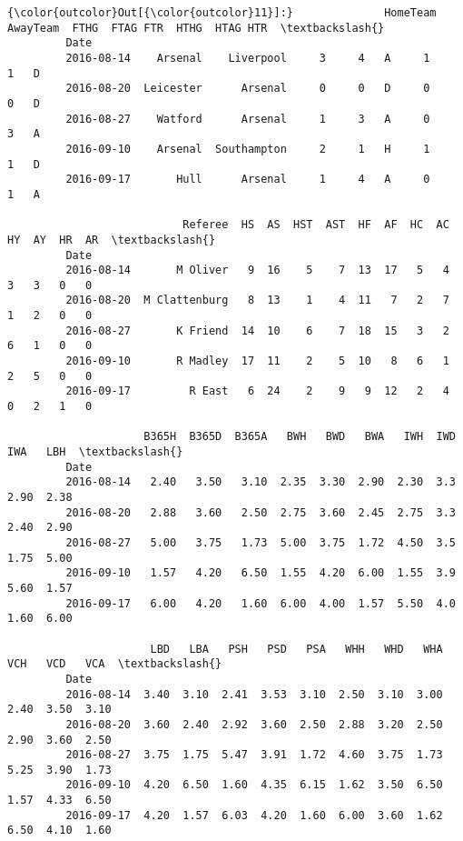 \documentclass[11pt]{article}
\begin{document}
\begin{Verbatim}[commandchars=\\\{\}]
{\color{outcolor}Out[{\color{outcolor}11}]:}              HomeTeam     AwayTeam  FTHG  FTAG FTR  HTHG  HTAG HTR  \textbackslash{}
         Date                                                                 
         2016-08-14    Arsenal    Liverpool     3     4   A     1     1   D   
         2016-08-20  Leicester      Arsenal     0     0   D     0     0   D   
         2016-08-27    Watford      Arsenal     1     3   A     0     3   A   
         2016-09-10    Arsenal  Southampton     2     1   H     1     1   D   
         2016-09-17       Hull      Arsenal     1     4   A     0     1   A   
         
                           Referee  HS  AS  HST  AST  HF  AF  HC  AC  HY  AY  HR  AR  \textbackslash{}
         Date                                                                          
         2016-08-14       M Oliver   9  16    5    7  13  17   5   4   3   3   0   0   
         2016-08-20  M Clattenburg   8  13    1    4  11   7   2   7   1   2   0   0   
         2016-08-27       K Friend  14  10    6    7  18  15   3   2   6   1   0   0   
         2016-09-10       R Madley  17  11    2    5  10   8   6   1   2   5   0   0   
         2016-09-17         R East   6  24    2    9   9  12   2   4   0   2   1   0   
         
                     B365H  B365D  B365A   BWH   BWD   BWA   IWH  IWD   IWA   LBH  \textbackslash{}
         Date                                                                       
         2016-08-14   2.40   3.50   3.10  2.35  3.30  2.90  2.30  3.3  2.90  2.38   
         2016-08-20   2.88   3.60   2.50  2.75  3.60  2.45  2.75  3.3  2.40  2.90   
         2016-08-27   5.00   3.75   1.73  5.00  3.75  1.72  4.50  3.5  1.75  5.00   
         2016-09-10   1.57   4.20   6.50  1.55  4.20  6.00  1.55  3.9  5.60  1.57   
         2016-09-17   6.00   4.20   1.60  6.00  4.00  1.57  5.50  4.0  1.60  6.00   
         
                      LBD   LBA   PSH   PSD   PSA   WHH   WHD   WHA   VCH   VCD   VCA  \textbackslash{}
         Date                                                                           
         2016-08-14  3.40  3.10  2.41  3.53  3.10  2.50  3.10  3.00  2.40  3.50  3.10   
         2016-08-20  3.60  2.40  2.92  3.60  2.50  2.88  3.20  2.50  2.90  3.60  2.50   
         2016-08-27  3.75  1.75  5.47  3.91  1.72  4.60  3.75  1.73  5.25  3.90  1.73   
         2016-09-10  4.20  6.50  1.60  4.35  6.15  1.62  3.50  6.50  1.57  4.33  6.50   
         2016-09-17  4.20  1.57  6.03  4.20  1.60  6.00  3.60  1.62  6.50  4.10  1.60   
         

\end{Verbatim}
\end{document}
